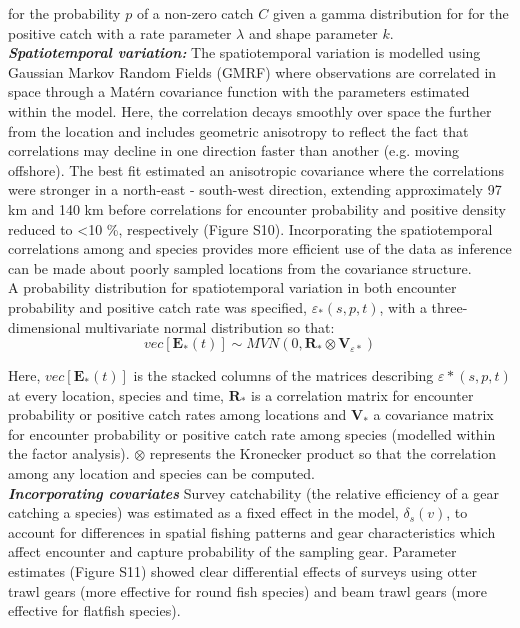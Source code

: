 \documentclass[fleqn,10pt]{wlscirep}
\begin{document}
\begin{linenumbers}
for the probability $p$ of a non-zero catch $C$ given a gamma distribution for
for the positive catch with a rate parameter $\lambda$ and shape parameter
$k$.\\

\textbf{\textit{Spatiotemporal variation:}} The spatiotemporal variation is
modelled using Gaussian Markov Random Fields (GMRF) where observations are
correlated in space through a Matérn covariance function with the parameters
estimated within the model. Here, the correlation decays smoothly over space
the further from the location and includes geometric anisotropy to reflect the
fact that correlations may decline in one direction faster than another (e.g.
moving offshore)\cite{Thorson2013}.  The best fit estimated an anisotropic
covariance where the correlations were stronger in a north-east - south-west
direction, extending approximately 97 km and 140 km before correlations for
encounter probability and positive density reduced to \textless 10 \%,
respectively (Figure S10).  Incorporating the spatiotemporal correlations among
and species provides more efficient use of the data as inference can be made
about poorly sampled locations from the covariance structure.\\

A probability distribution for spatiotemporal variation in both encounter
probability and positive catch rate was specified, $\varepsilon_{*}(s,p,t)$,
with a three-dimensional multivariate normal distribution so that:
	\begin{equation}
		vec[\mathbf{E}_{*}(t)] \sim MVN(0,\mathbf{R}_{*} \otimes
		\mathbf{V}_{{\varepsilon}{*}})
	\end{equation}

Here, $vec[\mathbf{E}_{*}(t)]$ is the stacked columns of the matrices
describing $\varepsilon{*}(s,p,t)$ at every location, species and time,
$\mathbf{R}_{*}$ is a correlation matrix for encounter probability or positive
catch rates among locations and $\mathbf{V}_{*}$ a covariance matrix for
encounter probability or positive catch rate among species (modelled
within the factor analysis). $\otimes$ represents the Kronecker product so that
the correlation among any location and species can be
computed\cite{Thorson2017}.\\
		
\textbf{\textit{Incorporating covariates}} Survey catchability (the relative
efficiency of a gear catching a species) was estimated as a fixed effect
in the model, $\delta_{s}(v)$, to account for differences in spatial fishing
patterns and gear characteristics which affect encounter and capture
probability of the sampling gear\cite{Thorson2014}. Parameter estimates
(Figure S11) showed clear differential effects of surveys using otter trawl
gears (more effective for round fish species) and beam trawl gears (more
effective for flatfish species).\\


\end{linenumbers}
\end{document}
